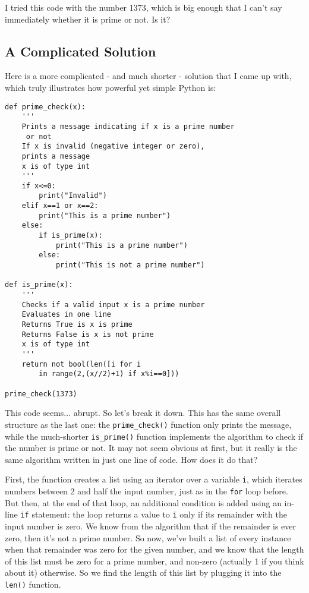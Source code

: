\documentclass[12pt]{article}
\newcommand{\code}{\texttt}
\begin{document}
I tried this code with the number 1373, which is big enough that I can't say immediately whether it is prime or not. Is it?

\subsection{A Complicated Solution}
Here is a more complicated - and much shorter - solution that I came up with, which truly illustrates how powerful yet simple Python is:

\begin{lstlisting}[frame=single] 
def prime_check(x):
    '''
    Prints a message indicating if x is a prime number
     or not
    If x is invalid (negative integer or zero), 
    prints a message
    x is of type int
    '''
    if x<=0:
        print("Invalid")
    elif x==1 or x==2:
        print("This is a prime number")
    else:
        if is_prime(x):
            print("This is a prime number")
        else:
            print("This is not a prime number")

def is_prime(x):
    '''
    Checks if a valid input x is a prime number
    Evaluates in one line
    Returns True is x is prime
    Returns False is x is not prime
    x is of type int 
    '''
    return not bool(len([i for i 
    	in range(2,(x//2)+1) if x%i==0]))

prime_check(1373)
\end{lstlisting}

This code seems... abrupt. So let's break it down. This has the same overall structure as the last one: the \code{prime\_check()} function only prints the message, while the much-shorter \code{is\_prime()} function implements the algorithm to check if the number is prime or not. It may not seem obvious at first, but it really is the same algorithm written in just one line of code. How does it do that?

First, the function creates a list using an iterator over a variable \code{i}, which iterates numbers between 2 and half the input number, just as in the \code{for} loop before. But then, at the end of that loop, an additional condition is added using an in-line \code{if} statement: the loop returns a value to \code{i} only if its remainder with the input number is zero. We know from the algorithm that if the remainder is ever zero, then it's not a prime number. So now, we've built a list of every instance when that remainder was zero for the given number, and we know that the length of this list must be zero for a prime number, and non-zero (actually 1 if you think about it) otherwise. So we find the length of this list by plugging it into the \code{len()} function.
\end{document}
